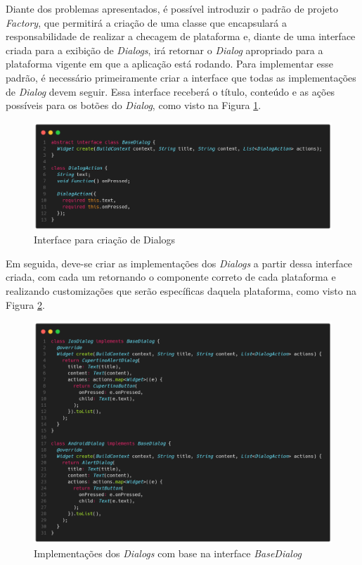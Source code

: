 \documentclass[12pt, %
openright, 
oneside, %
a4paper,    %
brazil]{facom-ufu-abntex2}
\begin{document}
Diante dos problemas apresentados, é possível introduzir o padrão de projeto \textit{Factory}, que permitirá a criação de uma classe que encapsulará a responsabilidade de realizar a checagem de plataforma e, diante de uma interface criada para a exibição de \textit{Dialogs}, irá retornar o \textit{Dialog} apropriado para a plataforma vigente em que a aplicação está rodando. Para implementar esse padrão, é necessário primeiramente criar a interface que todas as implementações de \textit{Dialog} devem seguir. Essa interface receberá o título, conteúdo e as ações possíveis para os botões do \textit{Dialog}, como visto na Figura \ref{fig:base_dialog}.

\begin{figure}[ht]
    \centering
    \includegraphics[width=.85\textwidth, trim={0 30 0 100}, clip]{figures/dialog/base_dialog.png}
    \caption{Interface para criação de Dialogs}
    \label{fig:base_dialog}
\end{figure}

Em seguida, deve-se criar as implementações dos \textit{Dialogs} a partir dessa interface criada, com cada um retornando o componente correto de cada plataforma e realizando customizações que serão específicas daquela plataforma, como visto na Figura \ref{fig:dialog_implementations}.


\begin{figure}[ht]
    \centering
    \includegraphics[width=.85\textwidth, trim={0 30 0 100}, clip]{figures/dialog/dialog_implementations.png}
    \caption{Implementações dos \textit{Dialogs} com base na interface \textit{BaseDialog}}
    \label{fig:dialog_implementations}
\end{figure}
\end{document}
